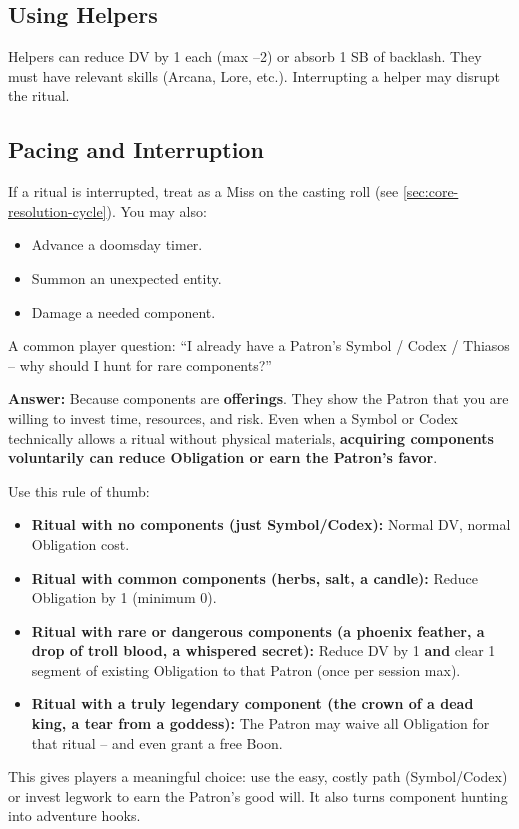 \subsection*{Using Helpers}
Helpers can reduce DV by 1 each (max --2) or absorb 1 SB of backlash. They must have relevant skills (Arcana, Lore, etc.). Interrupting a helper may disrupt the ritual.

\subsection*{Pacing and Interruption}
If a ritual is interrupted, treat as a Miss on the casting roll (see \ref{sec:core-resolution-cycle}). You may also:
\begin{itemize}
  \item Advance a doomsday timer.
  \item Summon an unexpected entity.
  \item Damage a needed component.
\end{itemize}

\begin{tcolorbox}[
  colback=green!5,
  colframe=green!75!black,
  title=Components as Devotion (Even with a Symbol/Codex/Thiasos),
  fonttitle=\bfseries
,breakable]
A common player question: ``I already have a Patron's Symbol / Codex / Thiasos -- why should I hunt for rare components?''

\textbf{Answer:} Because components are \textbf{offerings}. They show the Patron that you are willing to invest time, resources, and risk. Even when a Symbol or Codex technically allows a ritual without physical materials, \textbf{acquiring components voluntarily can reduce Obligation or earn the Patron's favor}.

Use this rule of thumb:
\begin{itemize}
  \item \textbf{Ritual with no components (just Symbol/Codex):} Normal DV, normal Obligation cost.
  \item \textbf{Ritual with common components (herbs, salt, a candle):} Reduce Obligation by 1 (minimum 0).
  \item \textbf{Ritual with rare or dangerous components (a phoenix feather, a drop of troll blood, a whispered secret):} Reduce DV by 1 \textbf{and} clear 1 segment of existing Obligation to that Patron (once per session max).
  \item \textbf{Ritual with a truly legendary component (the crown of a dead king, a tear from a goddess):} The Patron may waive all Obligation for that ritual -- and even grant a free Boon.
\end{itemize}

This gives players a meaningful choice: use the easy, costly path (Symbol/Codex) or invest legwork to earn the Patron's good will. It also turns component hunting into adventure hooks.
\end{tcolorbox}

